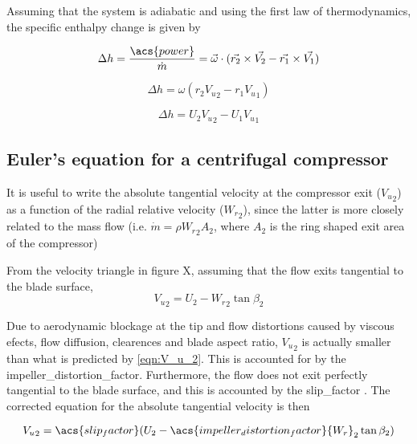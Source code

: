 \documentclass[tcc]{subfiles}
\begin{document}
Assuming that the system is adiabatic and using the first law of thermodynamics, the specific enthalpy change is given by

\begin{equation}
    \Delta h = \frac{\acs{power}}{\dot{m}} 
             = \vec{\omega} \cdot (\vec{r_2}\cross\vec{V_2} - \vec{r_1}\cross\vec{V_1}) 
\end{equation}

\begin{equation}
    \Delta h = \omega (r_2 {V_u}_2 - r_1 {V_u}_1) 
\end{equation}

\begin{equation}
    \label{eqn:euler}
    \Delta h = U_2 {V_u}_2 - U_1 {V_u}_1 
\end{equation}

\subsection{Euler's equation for a centrifugal compressor}

It is useful to write the absolute tangential velocity at the compressor exit (${V_u}_2$)
as a function of the radial relative velocity (${W_r}_2$),
since the latter is more closely related to the mass flow 
(i.e. $\dot{m} = \rho {W_r}_2 A_2$, where $A_2$ is the ring shaped exit area of the compressor)

From the velocity triangle in figure X, assuming that the flow exits tangential to the blade surface,
\begin{equation}
    \label{eqn:V_u_2}
    {V_u}_2 = U_2 - {W_r}_2 \tan\beta_2
\end{equation}

Due to aerodynamic blockage at the tip and flow distortions caused by viscous efects, flow diffusion, clearences and blade aspect ratio,
${V_u}_2$ is actually smaller than what is predicted by \cref{eqn:V_u_2}.
This is accounted for by the \acf{impeller_distortion_factor}.
Furthermore, the flow does not exit perfectly tangential to the blade surface, and this is accounted by the \acf{slip_factor} \cite{Wiesner1967,Aungier1995}.
The corrected equation for the absolute tangential velocity is then

\begin{equation}
    \label{eqn:V_u_2_corrected}
    {V_u}_2 = \acs{slip_factor}(U_2 - \acs{impeller_distortion_factor}{W_r}_2 \tan\beta_2)
\end{equation}
\end{document}
